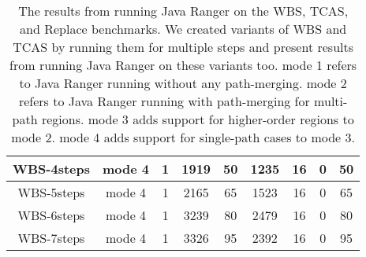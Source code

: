 \begin{table}[]
\begin{tabular}{@{}ccccccccc@{}}
        WBS-4steps                                                  & mode 4                                                       & 1                                                          & 1919                                                         & 50                                                             & 1235                                                                   & 16                                                            & 0                                                                      & 50       \\ \midrule
        WBS-5steps                                                  & mode 4                                                       & 1                                                          & 2165                                                         & 65                                                             & 1523                                                                   & 16                                                            & 0                                                                      & 65       \\ \midrule
        WBS-6steps                                                  & mode 4                                                       & 1                                                          & 3239                                                         & 80                                                             & 2479                                                                   & 16                                                            & 0                                                                      & 80       \\ \midrule
        WBS-7steps                                                  & mode 4                                                       & 1                                                          & 3326                                                         & 95                                                             & 2392                                                                   & 16                                                            & 0                                                                      & 95       \\ \bottomrule
    \end{tabular}
    \caption{The results from running Java Ranger on the WBS, TCAS, and Replace benchmarks. We created variants of WBS
    and TCAS by running them for multiple steps and present results from running Java Ranger on these variants too.
    mode 1 refers to Java Ranger running without any path-merging. mode 2 refers to Java Ranger running with path-merging
    for multi-path regions. mode 3 adds support for higher-order regions to mode 2. mode 4 adds support for single-path
    cases to mode 3.}
    \label{table:results}
\end{table}